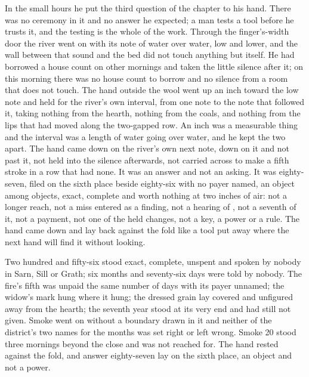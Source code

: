 In the small hours he put the third question of the chapter to his hand. There was no ceremony in it and no answer he expected; a man tests a tool before he trusts it, and the testing is the whole of the work. Through the finger's-width door the river went on with its note of water over water, low and lower, and the wall between that sound and the bed did not touch anything but itself. He had borrowed a house count on other mornings and taken the little silence after it; on this morning there was no house count to borrow and no silence from a room that does not touch. The hand outside the wool went up an inch toward the low note and held for the river's own interval, from one note to the note that followed it, taking nothing from the hearth, nothing from the coals, and nothing from the lips that had moved along the two-gapped row. An inch was a measurable thing and the interval was a length of water going over water, and he kept the two apart. The hand came down on the river's own next note, down on it and not past it, not held into the silence afterwards, not carried across to make a fifth stroke in a row that had none. It was an answer and not an asking. It was eighty-seven, filed on the sixth place beside eighty-six with no payer named, an object among objects, exact, complete and worth nothing at two inches of air: not a longer reach, not a miss entered as a finding, not a hearing of , not a seventh of it, not a payment, not one of the held changes, not a key, a power or a rule. The hand came down and lay back against the fold like a tool put away where the next hand will find it without looking.

Two hundred and fifty-six stood exact, complete, unspent and spoken by nobody in Sarn, Sill or Grath; six months and seventy-six days were told by nobody. The fire's fifth was unpaid the same number of days with its payer unnamed; the widow's mark hung where it hung; the dressed grain lay covered and unfigured away from the hearth; the seventh year stood at its very end and had still not given. Smoke went on without a boundary drawn in it and neither of the district's two names for the months was set right or left wrong. Smoke 20 stood three mornings beyond the close and was not reached for. The hand rested against the fold, and answer eighty-seven lay on the sixth place, an object and not a power.
